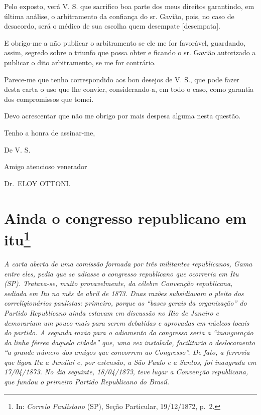 Pelo exposto, verá V. S. que sacrifico boa parte dos meus direitos
garantindo, em última análise, o arbitramento da confiança do sr.
Gavião, pois, no caso de desacordo, será o médico de sua escolha quem
desempate {[}desempata{]}.

E obrigo-me a não publicar o arbitramento se ele me for favorável,
guardando, assim, segredo sobre o triunfo que possa obter e ficando o
sr. Gavião autorizado a publicar o dito arbitramento, se me for
contrário.

Parece-me que tenho correspondido aos bon desejos de V. S., que pode
fazer desta carta o uso que lhe convier, considerando-a, em todo o caso,
como garantia dos compromissos que tomei.

Devo acrescentar que não me obrigo por mais despesa alguma nesta
questão.

Tenho a honra de assinar-me,

De V. S.

Amigo atencioso venerador

Dr.~ELOY OTTONI.

\chapter{Ainda o congresso republicano em itu\footnote{ In: \emph{Correio Paulistano} (SP), Seção Particular,
  19/12/1872, p.~2.}} %

\begin{didascalia}
\emph{A carta aberta de uma comissão formada por três militantes
republicanos, Gama entre eles, pedia que se adiasse o congresso
republicano que ocorreria em Itu (SP). Tratava-se, muito provavelmente,
da célebre Convenção republicana, sediada em Itu no mês de abril de
1873. Duas razões subsidiavam o pleito dos correligionários paulistas:
primeiro, porque as ``bases gerais da organização'' do Partido Republicano
ainda estavam em discussão no Rio de Janeiro e demorariam um pouco mais
para serem debatidas e aprovadas em núcleos locais do partido. A segunda
razão para o adiamento do congresso seria a ``inauguração da linha férrea
daquela cidade'' que, uma vez instalada, facilitaria o deslocamento ``a
grande número dos amigos que concorrem ao Congresso''. De fato, a
ferrovia que ligou Itu a Jundiaí e, por extensão, a São Paulo e a
Santos, foi inaugrada em 17/04/1873. No dia seguinte, 18/04/1873, teve
lugar a Convenção republicana, que fundou o primeiro Partido Republicano
do Brasil.}
\end{didascalia}

